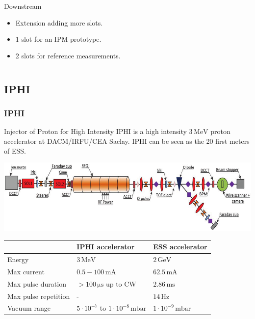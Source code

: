 \begin{frame}[t]
\begin{columns}[T]
    \begin{column}{0.45\textwidth}
      \begin{block}{Downstream}
        \begin{itemize}
          \item Extension adding more slots.
          \item 1 slot for an IPM prototype.
          \item 2 slots for reference measurements.
        \end{itemize}
      \end{block}
    \end{column}
  \end{columns}

\end{frame}

\subsection{IPHI}
\begin{frame}[t]
  \frametitle{IPHI}
  \begin{block}{Injector of Proton for High Intensity}
    IPHI is a high intensity $3\,\mathrm{MeV}$ proton accelerator at DACM/IRFU/CEA Saclay. IPHI can be seen as the 20 first meters of ESS.
  \end{block}
  \includegraphics[width=1\textwidth]{04_Test/fig/fig000_IPHI_view.png}
  \begin{tabularx}{\linewidth}{XXX}
    \toprule
                         & IPHI accelerator                                  & ESS accelerator                \\
    \midrule
    Energy               & $3\,\mathrm{MeV}$                                 & $2\,\mathrm{GeV}$              \\
    Max current          & $0.5-100\,\mathrm{mA}$                            & $62.5\,\mathrm{mA}$            \\
    Max pulse duration   & $>100\,\mathrm{\mu s}$ up to CW                   & $2.86\,\mathrm{ms}$            \\
    Max pulse repetition & -                                                 & $14\,\mathrm{Hz}$              \\
    Vacuum range         & $5\cdot10^{-7}$ to $1\cdot10^{-8}\,\mathrm{mbar}$ & $1\cdot10^{-9}\,\mathrm{mbar}$ \\
    \bottomrule
  \end{tabularx}
\end{frame}

